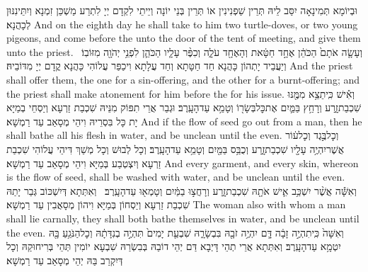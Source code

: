 {וּבְיוֹמָא תְּמִינָאָה יִסַּב לֵיהּ תְּרֵין שַׁפְנִינִין אוֹ תְּרֵין בְּנֵי יוֹנָה וְיֵיתֵי לִקְדָם יְיָ לִתְרַע מַשְׁכַּן זִמְנָא וְיִתֵּינִנּוּן לְכָהֲנָא׃}
{And on the eighth day he shall take to him two turtle-doves, or two young pigeons, and come before the \lord\space unto the door of the tent of meeting, and give them unto the priest.}{}
{וְעָשָׂ֤ה אֹתָם֙ הַכֹּהֵ֔ן אֶחָ֣ד חַטָּ֔את וְהָאֶחָ֖ד עֹלָ֑ה וְכִפֶּ֨ר עָלָ֧יו הַכֹּהֵ֛ן לִפְנֵ֥י יְהֹוָ֖ה מִזּוֹבֽוֹ׃ \setuma }
{וְיַעֲבֵיד יָתְהוֹן כָּהֲנָא חַד חַטָּתָא וְחַד עֲלָתָא וִיכַפַּר עֲלוֹהִי כָּהֲנָא קֳדָם יְיָ מִדּוֹבֵיהּ׃}
{And the priest shall offer them, the one for a sin-offering, and the other for a burnt-offering; and the priest shall make atonement for him before the \lord\space for his issue.}{}
{וְאִ֕ישׁ כִּֽי\maqqaf תֵצֵ֥א מִמֶּ֖נּוּ שִׁכְבַת\maqqaf זָ֑רַע וְרָחַ֥ץ בַּמַּ֛יִם אֶת\maqqaf כׇּל\maqqaf בְּשָׂר֖וֹ וְטָמֵ֥א עַד\maqqaf הָעָֽרֶב׃}
{וּגְבַר אֲרֵי תִפּוֹק מִנֵּיהּ שִׁכְבַת זַרְעָא וְיַסְחֵי בְמַיָּא יָת כָּל בִּסְרֵיהּ וִיהֵי מְסָאַב עַד רַמְשָׁא׃}
{And if the flow of seed go out from a man, then he shall bathe all his flesh in water, and be unclean until the even.}{}
{וְכׇל\maqqaf בֶּ֣גֶד וְכׇל\maqqaf ע֔וֹר אֲשֶׁר\maqqaf יִהְיֶ֥ה עָלָ֖יו שִׁכְבַת\maqqaf זָ֑רַע וְכֻבַּ֥ס בַּמַּ֖יִם וְטָמֵ֥א עַד\maqqaf הָעָֽרֶב׃}
{וְכָל לְבוּשׁ וְכָל מְשַׁךְ דִּיהֵי עֲלוֹהִי שִׁכְבַת זַרְעָא וְיִצְטְבַע בְּמַיָּא וִיהֵי מְסָאַב עַד רַמְשָׁא׃}
{And every garment, and every skin, whereon is the flow of seed, shall be washed with water, and be unclean until the even.}{}
{וְאִשָּׁ֕ה אֲשֶׁ֨ר יִשְׁכַּ֥ב אִ֛ישׁ אֹתָ֖הּ שִׁכְבַת\maqqaf זָ֑רַע וְרָחֲצ֣וּ בַמַּ֔יִם וְטָמְא֖וּ עַד\maqqaf הָעָֽרֶב׃ \petucha }
{וְאִתְּתָא דְּיִשְׁכּוֹב גְּבַר יָתַהּ שִׁכְבַת זַרְעָא וְיַסְחוֹן בְּמַיָּא וִיהוֹן מְסָאֲבִין עַד רַמְשָׁא׃}
{The woman also with whom a man shall lie carnally, they shall both bathe themselves in water, and be unclean until the even.}{}
{וְאִשָּׁה֙ כִּֽי\maqqaf תִהְיֶ֣ה זָבָ֔ה דָּ֛ם יִהְיֶ֥ה זֹבָ֖הּ בִּבְשָׂרָ֑הּ שִׁבְעַ֤ת יָמִים֙ תִּהְיֶ֣ה בְנִדָּתָ֔הּ וְכׇל\maqqaf הַנֹּגֵ֥עַ בָּ֖הּ יִטְמָ֥א עַד\maqqaf הָעָֽרֶב׃}
{וְאִתְּתָא אֲרֵי תְהֵי דָּיְבָא דַּם יְהֵי דוֹבַהּ בְּבִשְׂרַהּ שִׁבְעָא יוֹמִין תְּהֵי בְּרִיחוּקַהּ וְכָל דְּיִקְרַב בַּהּ יְהֵי מְסָאַב עַד רַמְשָׁא׃}
